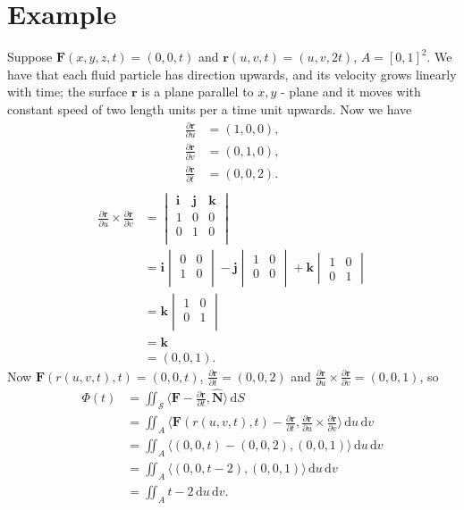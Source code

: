 \documentclass[12pt]{article}
\newcommand{\F}{\mathbf{F}}
\newcommand{\surf}{\mathbf{r}}
\newcommand{\N}{\hat{\mathbf{N}}}
\newcommand{\dr}{\partial \surf}
\newcommand{\du}{\partial u}
\newcommand{\dv}{\partial v}
\newcommand{\dt}{\partial t}
\newcommand{\dru}{\frac{\dr}{\du}}
\newcommand{\drv}{\frac{\dr}{\dv}}
\newcommand{\drt}{\frac{\dr}{\dt}}
\newcommand{\dS}{\,\mathrm{d}S}
\newcommand{\ii}{\mathbf{i}}
\newcommand{\jj}{\mathbf{j}}
\newcommand{\kk}{\mathbf{k}}
\newcommand{\ddu}{\, \mathrm{d}u}
\newcommand{\ddv}{\, \mathrm{d}v}
\begin{document}
\section*{Example}
Suppose $\F(x, y, z, t) = (0, 0, t)$ and $\surf(u, v, t) = (u, v, 2t)$, $A = \left[ 0, 1 \right]^2$. We have that each fluid particle has direction upwards, and its velocity grows linearly with time; the surface $\surf$ is a plane parallel to $x,y$ - plane and it moves with constant speed of two length units per a time unit upwards. Now we have
\begin{align*}
\dru &= (1, 0, 0), \\
\drv &= (0, 1, 0), \\
\drt &= (0, 0, 2). \\
\end{align*}
\begin{align*}
\dru \times \drv &= 
\begin{vmatrix}
\ii & \jj & \kk \\
1  & 0   & 0  \\
0  & 1   & 0 \\
\end{vmatrix} \\
      &= \ii \begin{vmatrix}
      0 & 0 \\
      1 & 0 \\
      \end{vmatrix}
      - \jj \begin{vmatrix}
      1 & 0 \\
      0 & 0 \\
      \end{vmatrix}
      + \kk \begin{vmatrix}
      1 & 0 \\
      0 & 1
      \end{vmatrix} \\
      &= \kk \begin{vmatrix}
      1 & 0 \\
      0 & 1 \\
      \end{vmatrix} \\
      &= \kk \\
      &= (0, 0, 1).
\end{align*}
Now $\F(r(u, v, t), t) = (0, 0, t)$, $\drt = (0, 0, 2)$ and $\dru \times \drv = (0, 0, 1)$, so
\begin{align*}
\Phi(t) &= \iint_{\mathscr{S}} \langle \F - \drt, \N \rangle \dS \\
          &= \iint_A \langle \F(r(u,v,t), t) - \drt, \dru \times \drv \rangle \ddu \ddv \\
          &= \iint_A \langle (0, 0, t) - (0, 0, 2), (0, 0, 1) \rangle \ddu \ddv \\
          &= \iint_A \langle (0, 0, t  - 2), (0, 0, 1) \rangle \ddu \ddv \\
          &= \iint_A t - 2 \ddu \ddv.
\end{align*}
\end{document}
